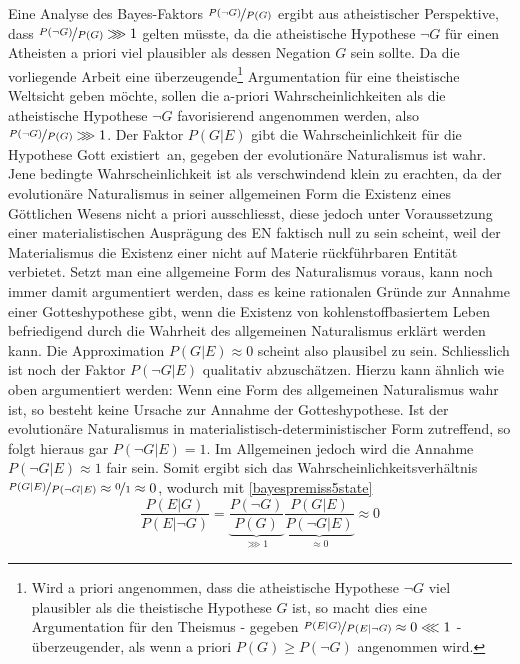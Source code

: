 \documentclass[a4paper,11pt]{article}
\numberwithin{equation}{section}
\begin{document}
\begin{equation}
\end{equation} Eine Analyse des Bayes-Faktors $\nicefrac{P(\neg G)}{P(G)}$ ergibt aus atheistischer Perspektive, dass $\nicefrac{P(\neg G)}{P(G)} \ggg 1$ gelten müsste, da die atheistische Hypothese $\neg G$ für einen Atheisten a priori viel plausibler als dessen Negation $G$ sein sollte. Da die vorliegende Arbeit eine überzeugende\footnote{Wird a priori angenommen, dass die atheistische Hypothese $\neg G$ viel plausibler als die theistische Hypothese $G$ ist, so macht dies eine Argumentation für den Theismus - gegeben $\nicefrac{P(E|G)}{P(E|\neg G)} \approx 0 \lll 1$ - überzeugender, als wenn a priori $P(G) \geq P(\neg G)$ angenommen wird.} Argumentation für eine theistische Weltsicht geben möchte, sollen die a-priori Wahrscheinlichkeiten als die atheistische Hypothese $\neg G$ favorisierend angenommen werden, also $\nicefrac{P(\neg G)}{P(G)} \ggg 1$. Der Faktor $P(G|E)$ gibt die Wahrscheinlichkeit für die Hypothese \flqq Gott existiert\frqq\ an, gegeben der evolutionäre Naturalismus ist wahr. Jene bedingte Wahrscheinlichkeit ist als verschwindend klein zu erachten, da der evolutionäre Naturalismus in seiner allgemeinen Form die Existenz eines Göttlichen Wesens nicht a priori ausschliesst, diese jedoch unter Voraussetzung einer materialistischen Ausprägung des EN faktisch null zu sein scheint, weil der Materialismus die Existenz einer nicht auf Materie rückführbaren Entität verbietet. Setzt man eine allgemeine Form des Naturalismus voraus, kann noch immer damit argumentiert werden, dass es keine rationalen Gründe zur Annahme einer Gotteshypothese gibt, wenn die Existenz von kohlenstoffbasiertem Leben befriedigend durch die Wahrheit des allgemeinen Naturalismus erklärt werden kann. Die Approximation $P(G|E) \approx 0$ scheint also plausibel zu sein. Schliesslich ist noch der Faktor $P(\neg G|E)$ qualitativ abzuschätzen. Hierzu kann ähnlich wie oben argumentiert werden: Wenn eine Form des allgemeinen Naturalismus wahr ist, so besteht keine Ursache zur Annahme der Gotteshypothese. Ist der evolutionäre Naturalismus in materialistisch-deterministischer Form zutreffend, so folgt hieraus gar $P(\neg G|E) = 1$. Im Allgemeinen jedoch wird die Annahme $P(\neg G|E) \approx 1$ fair sein. Somit ergibt sich das Wahrscheinlichkeitsverhältnis $\nicefrac{P(G|E)}{P(\neg G|E)} \approx \nicefrac{0}{1} \approx 0$, wodurch mit \eqref{bayespremiss5state} \begin{equation}
\frac{P(E| G)}{P(E|\neg G)}=\underbrace{\frac{P(\neg G)}{P(G)}}_{\ggg 1}\underbrace{\frac{P(G|E)}{P(\neg G|E)}}_{\approx 0} \approx 0

\end{equation}
\end{document}
